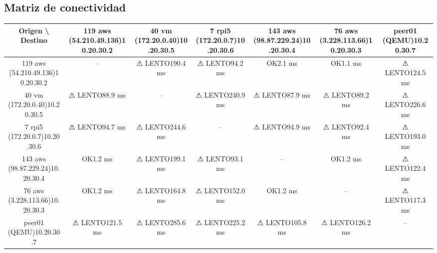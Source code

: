 \documentclass[11pt,a4paper]{article}
\begin{document}
\subsection{Matriz de conectividad}
\begin{longtable}{|c|c|c|c|c|c|c|}
\hline
Origen \textbackslash{} Destino & 119 aws (54.210.49.136)10.20.30.2 & 40 vm (172.20.0.40)10.20.30.5 & 7 rpi5 (172.20.0.7)10.20.30.6 & 143 aws (98.87.229.24)10.20.30.4 & 76 aws (3.228.113.66)10.20.30.3 & peer01 (QEMU)10.20.30.7 \\ \hline
119 aws (54.210.49.136)10.20.30.2 & -- & ⚠ LENTO190.4 ms & ⚠ LENTO94.2 ms & OK2.1 ms & OK1.1 ms & ⚠ LENTO124.5 ms \\ \hline
40 vm (172.20.0.40)10.20.30.5 & ⚠ LENTO88.9 ms & -- & ⚠ LENTO240.9 ms & ⚠ LENTO87.9 ms & ⚠ LENTO89.2 ms & ⚠ LENTO226.6 ms \\ \hline
7 rpi5 (172.20.0.7)10.20.30.6 & ⚠ LENTO94.7 ms & ⚠ LENTO244.6 ms & -- & ⚠ LENTO94.9 ms & ⚠ LENTO92.4 ms & ⚠ LENTO193.0 ms \\ \hline
143 aws (98.87.229.24)10.20.30.4 & OK1.2 ms & ⚠ LENTO199.1 ms & ⚠ LENTO93.1 ms & -- & OK1.2 ms & ⚠ LENTO122.4 ms \\ \hline
76 aws (3.228.113.66)10.20.30.3 & OK1.2 ms & ⚠ LENTO164.8 ms & ⚠ LENTO152.0 ms & OK1.2 ms & -- & ⚠ LENTO117.3 ms \\ \hline
peer01 (QEMU)10.20.30.7 & ⚠ LENTO121.5 ms & ⚠ LENTO285.6 ms & ⚠ LENTO225.2 ms & ⚠ LENTO105.8 ms & ⚠ LENTO126.2 ms & -- \\ \hline
\end{longtable}
\end{document}
